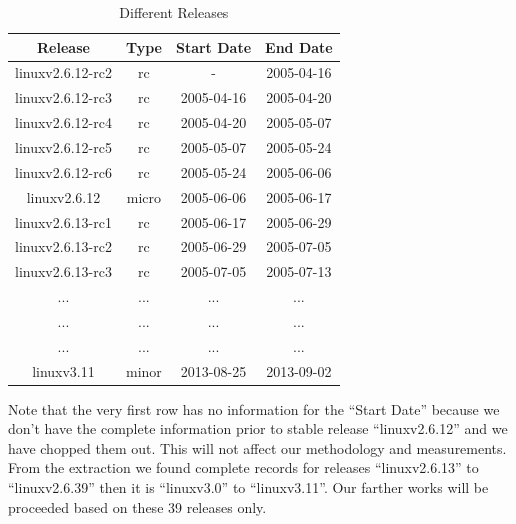 \documentclass{acm_proc_article-sp}
\begin{document}
\begin{table}[ht]
\caption{Different Releases}  	%
\centering 						%
\begin{tabular}{c c c c}				%
\hline\hline						%
Release & Type & Start Date & End Date \\ [0.5ex]
\hline 							%
linuxv2.6.12-rc2 	& rc       	& - & 2005-04-16 \\
linuxv2.6.12-rc3 	& rc       	& 2005-04-16 	& 2005-04-20 \\
linuxv2.6.12-rc4 	& rc       	& 2005-04-20 	& 2005-05-07 \\
linuxv2.6.12-rc5 	& rc       	& 2005-05-07 	& 2005-05-24 \\
linuxv2.6.12-rc6 	& rc       	& 2005-05-24 	& 2005-06-06 \\
linuxv2.6.12     	& micro 		& 2005-06-06 	& 2005-06-17 \\
linuxv2.6.13-rc1 	& rc       	& 2005-06-17 	& 2005-06-29 \\
linuxv2.6.13-rc2 	& rc       	& 2005-06-29 	& 2005-07-05 \\
linuxv2.6.13-rc3 	& rc       	& 2005-07-05 	& 2005-07-13 \\
...			     	& ...	   	& ... 		    & ...\\
...			     	& ...	   	& ... 		    & ... \\
...			     	& ...	   	& ... 		    & ... \\
linuxv3.11          	& minor 	& 2013-08-25 		& 2013-09-02 \\
[1ex]							%
\hline 							%
\end{tabular}
\label{table:nonlin} 			%
\end{table}

Note that the very first row has no information for the ``Start Date'' because we don't have the  complete information prior to stable release ``linuxv2.6.12'' and we have chopped them out. This will not affect our methodology and measurements. From the extraction we found complete records for releases ``linuxv2.6.13'' to ``linuxv2.6.39'' then it is ``linuxv3.0'' to ``linuxv3.11''. Our farther works will be proceeded based on these 39 releases only.
\end{document}
